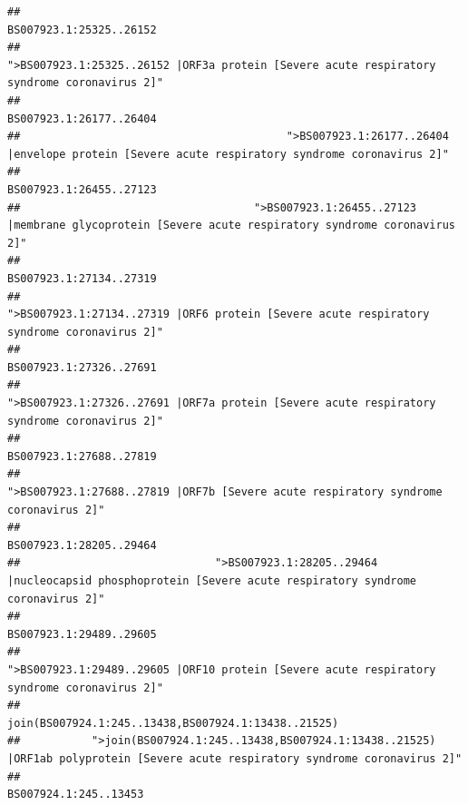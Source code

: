 \documentclass[
]{article}
\begin{document}
\begin{verbatim}
##                                                                                                                BS007923.1:25325..26152 
##                                            ">BS007923.1:25325..26152 |ORF3a protein [Severe acute respiratory syndrome coronavirus 2]" 
##                                                                                                                BS007923.1:26177..26404 
##                                         ">BS007923.1:26177..26404 |envelope protein [Severe acute respiratory syndrome coronavirus 2]" 
##                                                                                                                BS007923.1:26455..27123 
##                                    ">BS007923.1:26455..27123 |membrane glycoprotein [Severe acute respiratory syndrome coronavirus 2]" 
##                                                                                                                BS007923.1:27134..27319 
##                                             ">BS007923.1:27134..27319 |ORF6 protein [Severe acute respiratory syndrome coronavirus 2]" 
##                                                                                                                BS007923.1:27326..27691 
##                                            ">BS007923.1:27326..27691 |ORF7a protein [Severe acute respiratory syndrome coronavirus 2]" 
##                                                                                                                BS007923.1:27688..27819 
##                                                    ">BS007923.1:27688..27819 |ORF7b [Severe acute respiratory syndrome coronavirus 2]" 
##                                                                                                                BS007923.1:28205..29464 
##                              ">BS007923.1:28205..29464 |nucleocapsid phosphoprotein [Severe acute respiratory syndrome coronavirus 2]" 
##                                                                                                                BS007923.1:29489..29605 
##                                            ">BS007923.1:29489..29605 |ORF10 protein [Severe acute respiratory syndrome coronavirus 2]" 
##                                                                                    join(BS007924.1:245..13438,BS007924.1:13438..21525) 
##           ">join(BS007924.1:245..13438,BS007924.1:13438..21525) |ORF1ab polyprotein [Severe acute respiratory syndrome coronavirus 2]" 
##                                                                                                                  BS007924.1:245..13453 

\end{verbatim}
\end{document}

